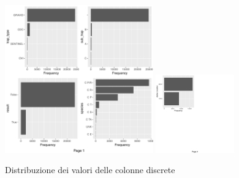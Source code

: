 \begin{figure}[H]
	\centering
	\includegraphics[width=0.57\textwidth]{images/ml/plot_bar1}
	\includegraphics[width=0.3\textwidth]{images/ml/plot_bar2}
	\caption{Distribuzione dei valori delle colonne discrete}
	\label{fig:plot_bar}
\end{figure}

